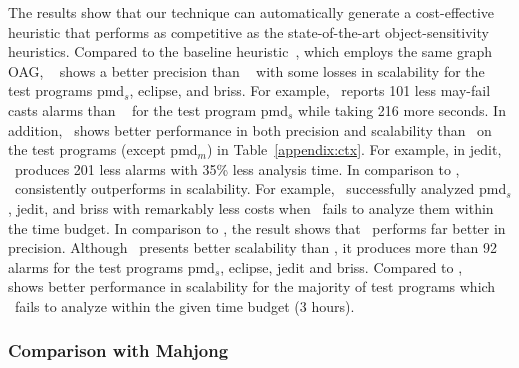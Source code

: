 The results show that our technique can automatically generate a cost-effective heuristic that performs as competitive as the state-of-the-art object-sensitivity heuristics.
Compared to the baseline heuristic~\Scaler, which employs the same graph OAG, \OurCtx~%
shows a better precision than \Scaler~
with some losses in scalability for the test programs pmd$_{s}$, eclipse, and briss.
For example, \OurCtx~reports 101 less may-fail casts alarms than \Scaler~ for the test program pmd$_{s}$
while taking 216 more seconds.
In addition, \OurCtx~shows better performance in both precision and scalability than \Scaler~on the test programs (except pmd$_m$) in Table~\ref{appendix:ctx}.
For example, in jedit, \OurCtx~produces 201 less alarms with 35\% less analysis time.
In comparison to \Zipper, \OurCtx~consistently outperforms in scalability.
For example, \OurCtx~successfully analyzed pmd$_{s}$, jedit, and briss with remarkably less costs when \Zipper~fails to analyze them within the time budget.
In comparison to \Data, the result shows that \OurCtx~performs far better in precision.
Although \Data~presents better scalability than \OurCtx, it produces more than 92 alarms for the test programs pmd$_{s}$, eclipse, jedit and briss.
Compared to \twoobjH, \OurCtx~ shows better performance in scalability for the majority of test programs which \twoobjH~fails to analyze within the given time budget (3 hours).

\subsubsection{Comparison with Mahjong}\label{sec:eval_heap}

